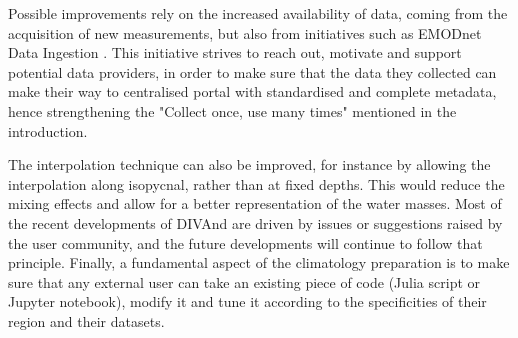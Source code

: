 \documentclass[essd,manuscript]{copernicus}
\begin{document}
Possible improvements rely on the increased availability of data, coming from the acquisition of new measurements, but also from initiatives such as EMODnet Data Ingestion \citep{IONA2024}. This initiative strives to reach out, motivate and support potential data providers, in order to make sure that the data they collected can make their way to centralised portal with standardised and complete metadata, hence strengthening the "Collect once, use many times" mentioned in the introduction. 

The interpolation technique can also be improved, for instance by allowing the interpolation along isopycnal, rather than at fixed depths. This would reduce the mixing effects and allow for a better representation of the water masses. Most of the recent developments of DIVAnd are driven by issues or suggestions raised by the user community, and the future developments will continue to follow that principle. Finally, a fundamental aspect of the climatology preparation is to make sure that any external user can take an existing piece of code (Julia script or Jupyter notebook), modify it and tune it according to the specificities of their region and their datasets. 
\end{document}
